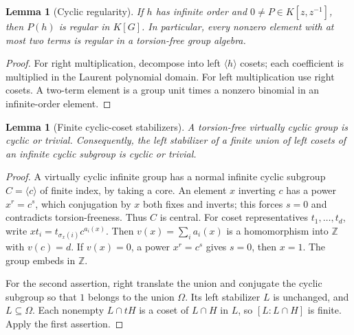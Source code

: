 \documentclass[11pt,a4paper,oneside]{report}
\newtheorem{lemma}[theorem]{Lemma}
\theoremstyle{definition}
\theoremstyle{remark}
\newcommand{\Z}{\mathbb Z}
\begin{document}
\begin{lemma}[Cyclic regularity]\label{M10:lem:cyclic}
If $h$ has infinite order and $0\ne P\in K[z,z^{-1}]$, then $P(h)$
is regular in $K[G]$. In particular, every nonzero element with at
most two terms is regular in a torsion-free group algebra.
\end{lemma}
\begin{proof}
For right multiplication, decompose into left $\langle h\rangle$
cosets; each coefficient is multiplied in the Laurent polynomial
domain. For left multiplication use right cosets. A two-term element
is a group unit times a nonzero binomial in an infinite-order element.
\end{proof}

\begin{lemma}[Finite cyclic-coset stabilizers]\label{M10:lem:stab}
A torsion-free virtually cyclic group is cyclic or trivial.
Consequently, the left stabilizer of a finite union of left cosets
of an infinite cyclic subgroup is cyclic or trivial.
\end{lemma}
\begin{proof}
A virtually cyclic infinite group has a normal infinite cyclic
subgroup $C=\langle c\rangle$ of finite index, by taking a core.
An element $x$ inverting $c$ has a power $x^r=c^s$, which conjugation
by $x$ both fixes and inverts; this forces $s=0$ and contradicts
torsion-freeness. Thus $C$ is central. For coset representatives
$t_1,\ldots,t_d$, write $xt_i=t_{\sigma_x(i)}c^{a_i(x)}$.
Then $v(x)=\sum_i a_i(x)$ is a homomorphism into $\Z$ with $v(c)=d$.
If $v(x)=0$, a power $x^r=c^s$ gives $s=0$, then $x=1$.
The group embeds in $\Z$.

For the second assertion, right translate the union and conjugate
the cyclic subgroup so that $1$ belongs to the union $\Omega$.
Its left stabilizer $L$ is unchanged, and $L\subseteq\Omega$.
Each nonempty $L\cap tH$ is a coset of $L\cap H$ in $L$, so
$[L:L\cap H]$ is finite. Apply the first assertion.
\end{proof}
\end{document}
